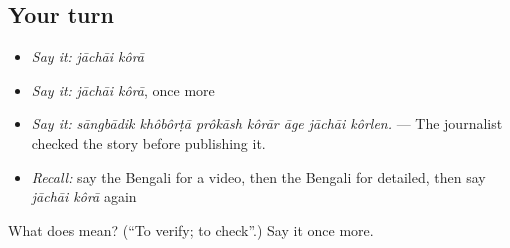 \subsection*{Your turn}
\begin{itemize}
\raggedright
  \item \emph{Say it:} \emph{jāchāi kôrā}
  \item \emph{Say it:} \emph{jāchāi kôrā}, once more
  \item \emph{Say it:} \emph{sāngbādik khôbôrṭā prôkāsh kôrār āge jāchāi kôrlen.} — The journalist checked the story before publishing it.
  \item \emph{Recall:} say the Bengali for a video, then the Bengali for detailed, then say \emph{jāchāi kôrā} again
\end{itemize}

\begin{tcolorbox}[breakable,colback=teal!4,colframe=teal!35!black,title={Before you move on}]
What does   mean? (\textquotedblleft{}To verify; to check\textquotedblright{}.) Say it once more.
\end{tcolorbox}
